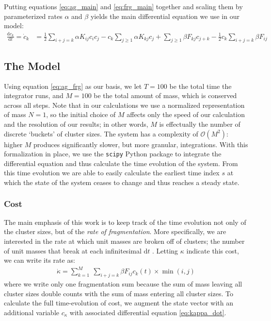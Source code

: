 \documentclass[fleqn,10pt]{wlscirep}
\begin{document}
Putting equations \eqref{eq:ag_main} and \eqref{eq:frg_main} together and scaling them by parameterized rates $ \alpha$ and $\beta $  yields the main differential equation we use in our model:
\begin{align}
    \frac{\mathrm{d} c_{k}}{\mathrm{d} t }   = \dot{c}_k & = \frac{1}{2} \sum _{i+j=k} \alpha K_{ij}c_{i}c_{j} - c_{k}\sum _{j \geq  1} \alpha K_{kj}c_{j} + \sum _{j\geq  1} \beta F_{kj} c_{j+k} - \frac{1}{2} c_{k} \sum _{i+j=k} \beta F_{ij} \label{eq:ag_frg}
\end{align}


\subsection*{The Model}


Using equation \eqref{eq:ag_frg} as our basis, we let $ T = 100  $ be the total time the integrator runs, and $ M = 100 $ be the total amount of mass, which is conserved across all steps.
Note that in our calculations we use a normalized representation of mass $ N=1$, so the initial choice of $ M $ affects only the speed of our calculation and the resolution of our results; in other words, $ M $  is effectually the number of discrete `buckets' of cluster sizes.
The system has a complexity of $ \mathcal{O}(M^2) $: higher $ M $  produces significantly slower, but more granular, integrations.
With this formalization in place, we use the \verb|scipy| Python package to integrate the differential equation and thus calculate the time evolution of the system.
From this time evolution we are able to easily calculate the earliest time index $ s $  at which the state of the system ceases to change and thus reaches a steady state.

\subsubsection*{Cost}
The main emphasis of this work is to keep track of the time evolution not only of the cluster sizes, but of the \textit{rate of fragmentation}.
More specifically, we are interested in the rate at which unit masses are broken off of clusters; the number of unit masses that break at each infinitesimal $ \mathrm{d}t  $ .
Letting $ \kappa $ indicate this cost, we can write its rate as:
\begin{align}
    \dot{\kappa} = \sum_{k = 1}^{M} \  \sum_{i + j = k } \beta F_{ij}c_{k}(t) \times \min(i, j) \label{eq:kappa_dot}
\end{align}
where we write only one fragmentation sum because the sum of mass leaving all cluster sizes double counts with the sum of mass entering all cluster sizes.
To calculate the full time-evolution of cost, we augment the state vector with an additional variable $ c_\kappa $ with associated differential equation  \eqref{eq:kappa_dot}.
\end{document}
